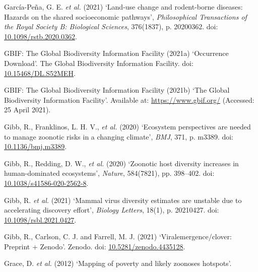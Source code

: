 \documentclass[
]{article}
\newlength{\cslhangindent}
\newlength{\cslentryspacingunit} %
\newenvironment{CSLReferences}[2] %
 {%
  \setlength{\parindent}{0pt}
  \ifodd #1
  \let\oldpar\par
  \def\par{\hangindent=\cslhangindent\oldpar}
  \fi
  \setlength{\parskip}{#2\cslentryspacingunit}
 }%
 {}
\begin{document}
\begin{CSLReferences}{0}{0}
\leavevmode{}%
García-Peña, G. E. \emph{et al.} (2021) {`Land-use change and
rodent-borne diseases: Hazards on the shared socioeconomic pathways'},
\emph{Philosophical Transactions of the Royal Society B: Biological
Sciences}, 376(1837), p. 20200362. doi:
\href{https://doi.org/10.1098/rstb.2020.0362}{10.1098/rstb.2020.0362}.

\leavevmode{}%
GBIF: The Global Biodiversity Information Facility (2021a) {`Occurrence
{Download}'}. The Global Biodiversity Information Facility. doi:
\href{https://doi.org/10.15468/DL.S52MEH}{10.15468/DL.S52MEH}.

\leavevmode{}%
GBIF: The Global Biodiversity Information Facility (2021b) {`The
{Global} {Biodiversity} {Information} {Facility}'}. Available at:
\url{https://www.gbif.org/} (Accessed: 25 April 2021).

\leavevmode{}%
Gibb, R., Franklinos, L. H. V., \emph{et al.} (2020) {`Ecosystem
perspectives are needed to manage zoonotic risks in a changing
climate'}, \emph{BMJ}, 371, p. m3389. doi:
\href{https://doi.org/10.1136/bmj.m3389}{10.1136/bmj.m3389}.

\leavevmode{}%
Gibb, R., Redding, D. W., \emph{et al.} (2020) {`Zoonotic host diversity
increases in human-dominated ecosystems'}, \emph{Nature}, 584(7821), pp.
398--402. doi:
\href{https://doi.org/10.1038/s41586-020-2562-8}{10.1038/s41586-020-2562-8}.

\leavevmode{}%
Gibb, R. \emph{et al.} (2021) {`Mammal virus diversity estimates are
unstable due to accelerating discovery effort'}, \emph{Biology Letters},
18(1), p. 20210427. doi:
\href{https://doi.org/10.1098/rsbl.2021.0427}{10.1098/rsbl.2021.0427}.

\leavevmode{}%
Gibb, R., Carlson, C. J. and Farrell, M. J. (2021)
{`Viralemergence/clover: {Preprint} + {Zenodo}'}. Zenodo. doi:
\href{https://doi.org/10.5281/zenodo.4435128}{10.5281/zenodo.4435128}.

\leavevmode{}%
Grace, D. \emph{et al.} (2012) {`Mapping of poverty and likely zoonoses
hotspots'}.


\end{CSLReferences}
\end{document}
